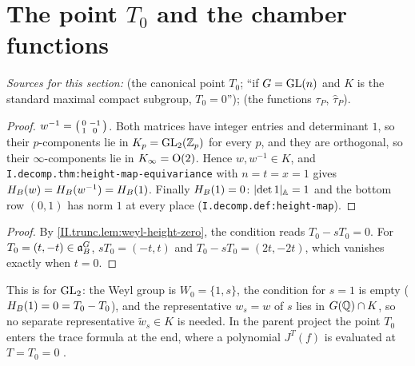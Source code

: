 \section{The point \texorpdfstring{$T_0$}{T0} and the chamber functions}\label{sec:trunc-t-zero}

\noindent\emph{Sources for this section:} \cite[§9, (9.4)]{AIntro} (the canonical point $T_0$; ``if $G=\mathrm{GL}(n)$ and $K$ is the standard maximal compact
subgroup, $T_0=0$''); \cite[§5]{AIntro} (the functions $\tau_P$, $\hat\tau_P$).

\begin{lemma}
\end{lemma}
\begin{proof}
$w^{-1}=\begin{psmallmatrix}0&-1\\1&0\end{psmallmatrix}$. Both matrices have integer entries and determinant $1$, so their $p$-components lie in
$K_p=\mathrm{GL}_2(\mathbb{Z}_p)$ for every $p$, and they are orthogonal, so their $\infty$-components lie in $K_\infty=\mathrm{O}(2)$. Hence $w,w^{-1}\in K$, and
\texttt{I.decomp.thm:height-map-equivariance} with $n=t=x=1$ gives $H_B(w)=H_B(w^{-1})=H_B(1)$. Finally $H_B(1)=0$: $\lvert\det1\rvert_{\mathbb{A}}=1$ and the
bottom row $(0,1)$ has norm $1$ at every place (\texttt{I.decomp.def:height-map}).
\end{proof}

\begin{theorem}[$T_0=0$]
\end{theorem}
\begin{proof}
By \cref{II.trunc.lem:weyl-height-zero}, the condition reads $T_0-sT_0=0$. For $T_0=(t,-t)\in\mathfrak{a}_B^G$, $sT_0=(-t,t)$ and $T_0-sT_0=(2t,-2t)$, which
vanishes exactly when $t=0$.
\end{proof}
\noindent This is \cite[(9.4)]{AIntro} for $\mathrm{GL}_2$: the Weyl group is $W_0=\{1,s\}$, the condition for $s=1$ is empty ($H_B(1)=0=T_0-T_0$), and the
representative $w_s=w$ of $s$ lies in $G(\mathbb{Q})\cap K$, so no separate representative $\tilde w_s\in K$ is needed. In the parent project the point $T_0$ enters
the trace formula at the end, where a polynomial $J^T(f)$ is evaluated at $T=T_0=0$ \cite[§9]{AIntro}.

